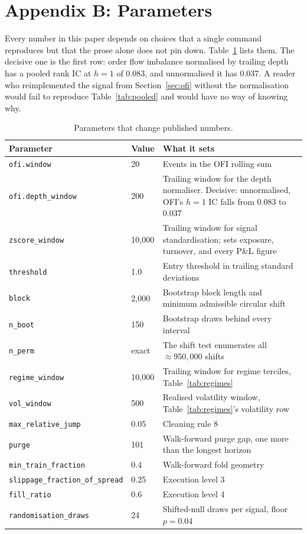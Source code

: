\documentclass[11pt]{scrartcl}
\begin{document}
\section{Appendix B: Parameters}
\label{sec:params}

Every number in this paper depends on choices that a single command reproduces but that the prose alone does not pin down. Table~\ref{tab:params} lists them. The decisive one is the first row: order flow imbalance normalised by trailing depth has a pooled rank IC at $h=1$ of 0.083, and unnormalised it has 0.037. A reader who reimplemented the signal from Section~\ref{sec:ofi} without the normalisation would fail to reproduce Table~\ref{tab:pooled} and would have no way of knowing why.

\begin{table}[H]
\centering
\caption{Parameters that change published numbers.}
\label{tab:params}
\begin{tabular}{llp{6.4cm}}
\toprule
Parameter & Value & What it sets \\
\midrule
\texttt{ofi.window}                & 20     & Events in the OFI rolling sum \\
\texttt{ofi.depth\_window}         & 200    & Trailing window for the depth normaliser. Decisive: unnormalised, OFI's $h{=}1$ IC falls from 0.083 to 0.037 \\
\texttt{zscore\_window}            & 10{,}000 & Trailing window for signal standardisation; sets exposure, turnover, and every P\&L figure \\
\texttt{threshold}                 & 1.0    & Entry threshold in trailing standard deviations \\
\texttt{block}                     & 2{,}000 & Bootstrap block length and minimum admissible circular shift \\
\texttt{n\_boot}                   & 150    & Bootstrap draws behind every interval \\
\texttt{n\_perm}                   & exact  & The shift test enumerates all $\approx 950{,}000$ shifts \\
\texttt{regime\_window}            & 10{,}000 & Trailing window for regime terciles, Table~\ref{tab:regimes} \\
\texttt{vol\_window}               & 500    & Realised volatility window, Table~\ref{tab:regimes}'s volatility row \\
\texttt{max\_relative\_jump}       & 0.05   & Cleaning rule 8 \\
\texttt{purge}                     & 101    & Walk-forward purge gap, one more than the longest horizon \\
\texttt{min\_train\_fraction}      & 0.4    & Walk-forward fold geometry \\
\texttt{slippage\_fraction\_of\_spread} & 0.25 & Execution level 3 \\
\texttt{fill\_ratio}               & 0.6    & Execution level 4 \\
\texttt{randomisation\_draws}      & 24     & Shifted-null draws per signal, floor $p = 0.04$ \\
\bottomrule
\end{tabular}
\end{table}
\end{document}
